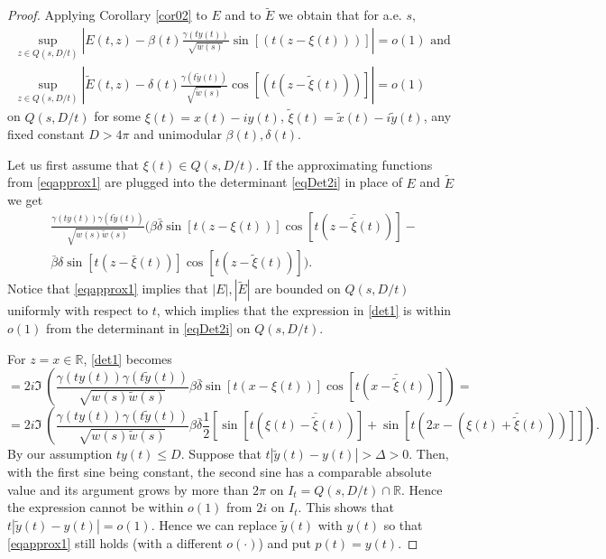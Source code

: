 \documentclass[11pt,twoside,reqno]{amsart}
\def\ti{\tilde}
\def\R{{\mathbb R}}
\def\e{\varepsilon}
\def\d{\delta}
\def\g{\gamma}
\def\a{\alpha}
\def\b{\beta}
\theoremstyle{plain}
\numberwithin{equation}{section}
\begin{document}

\begin{proof}




Applying Corollary \ref{cor02} to $E$ and to $\ti E$ we obtain that for a.e. $s$,
\begin{equation}
\begin{gathered}
\sup_{z\in Q(s,D/t)}\left|E(t,z)-\b(t)\frac{\g(ty(t))}{\sqrt{w(s)}}\sin[(t(z-\xi(t)))]\right|=o(1)\textrm{ and }\\
 \sup_{z\in Q(s,D/t)}\left|\ti E(t,z)-\d(t)\frac{\g(t\ti y(t))}{\sqrt{\ti w(s)}}\cos[(t(z-\ti \xi(t)))]\right|=o(1)
 \label{eqapprox1}\end{gathered}\end{equation}
on $Q(s,D/t)$ for some $\xi(t)=x(t)-iy(t)$, $\ti \xi(t)=\ti x(t)-i\ti y(t)$,  any fixed constant $D>4\pi$ and unimodular $\b(t),\d(t)$.

Let us first assume that $\xi(t)\in Q(s,D/t)$.
If the approximating functions from \eqref{eqapprox1} are plugged into the determinant \eqref{eqDet2i} in place of $E$ and $\ti E$ we get
\begin{equation}\begin{gathered} \frac{\g(ty(t))\g(t\ti y(t))}{\sqrt{w(s)\ti w(s)}}(   \b\bar\d \sin [t(z - \xi(t))]\cos [t(z - \bar{ \ti \xi}(t))] - \\
 \bar \b\d \sin [t(z -\bar  \xi(t))]\cos [t(z -  \ti \xi(t))]).
\label{det1}\end{gathered}\end{equation}
 Notice that \eqref{eqapprox1} implies that
$|E|,|\ti E|$ are bounded on $Q(s,D/t)$ uniformly with respect to $t$,
which implies that the  expression in \eqref{det1} is within $o(1)$ from
the determinant in \eqref{eqDet2i} on $Q(s,D/t)$.

For $z=x\in\R$, \eqref{det1} becomes
$$ = 2i \Im\  \left(\frac{\g(ty(t))\g(t\ti y(t))}{\sqrt{w(s)\ti w(s)}} \b\bar\d \sin [t(x - \xi(t))]\cos [t(x - \bar {\ti \xi}(t))]\right)=
$$$$
=2i \Im\  \left(\frac{\g(ty(t))\g(t\ti y(t))}{\sqrt{w(s)\ti w(s)}} \b\bar\d \frac 12\left[ \sin [t(\xi(t)-\bar {\ti \xi}(t))] + \sin [t(2x- (\xi(t) +\bar {\ti \xi}(t)))]    \right]\right).
$$
 By our assumption $ty(t)\leq D$. Suppose that  $t|\ti y(t)-y(t)|>\Delta>0$.
   Then, with the first sine being constant,
the second sine has a comparable absolute value  and its argument grows by more than $2\pi$ on $I_t=Q(s,D/t)\cap\R$. Hence the expression
cannot be within $o(1)$ from $2i$ on $I_t$. This shows that $t|\ti y(t) - y(t)|=o(1)$. Hence we can replace $\ti y(t)$ with $ y(t)$
so that \eqref{eqapprox1} still holds (with a different $o(\cdot)$) and put $p(t)=y(t)$.



\end{proof}
\end{document}
